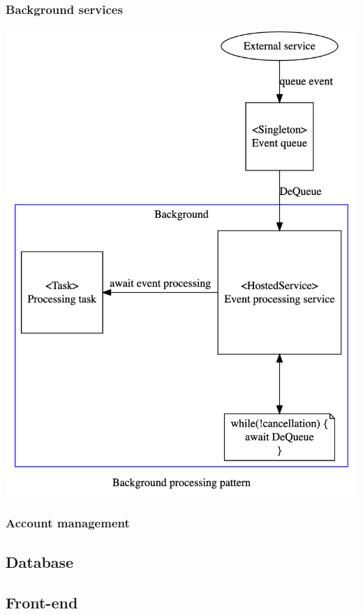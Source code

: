 \documentclass[12pt]{article}
\begin{document}
\subsubsection{Background services}

\includegraphics[width=\textwidth,height=\textheight,keepaspectratio]{images/patterns/background-processing-pattern}

\subsubsection{Account management}

\subsection{Database}

\subsection{Front-end}
\end{document}
